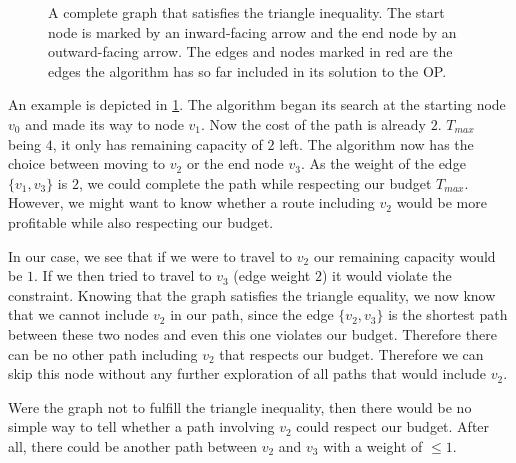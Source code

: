 \begin{figure}
  \centering
  \caption{A complete graph that satisfies the triangle inequality. 
  The start node is marked by an inward-facing arrow and the end node by an outward-facing arrow. 
  The edges and nodes marked in red are the edges the algorithm has so far included in its solution to the OP.}
  \label{fig:02:example_triangle}
\end{figure}

An example is depicted in \cref{fig:02:example_triangle}. The algorithm began its search at the starting node $v_0$ and made its way to node $v_1$.
Now the cost of the path is already $2$. $T_{max}$ being $4$, it only has remaining capacity of $2$ left.
The algorithm now has the choice between moving to $v_2$ or the end node $v_3$. As the weight of the edge $\{v_1, v_3\}$ is $2$, we could complete the path while respecting our budget $T_{max}$.
However, we might want to know whether a route including $v_2$ would be more profitable while also respecting our budget.

In our case, we see that if we were to travel to $v_2$ our remaining capacity would be $1$.
If we then tried to travel to $v_3$ (edge weight $2$) it would violate the constraint.
Knowing that the graph satisfies the triangle equality, we now know that we cannot include $v_2$ in our path, since the edge $\{v_2, v_3\}$ is the shortest path between these two nodes and even this one violates our budget. Therefore there can be no other path including $v_2$ that respects our budget. 
Therefore we can skip this node without any further exploration of all paths that would include $v_2$. 

Were the graph not to fulfill the triangle inequality, then there would be no simple way to tell whether a path involving $v_2$ could respect our budget.
After all, there could be another path between $v_2$ and $v_3$ with a weight of $\leq 1$.


